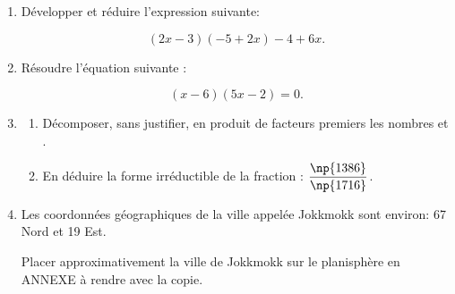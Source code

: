\documentclass[exercice,a4]{thedocument}%
\begin{document}
\begin{enumerate}
\item Développer et réduire l'expression suivante:

\[(2x - 3)(- 5 + 2x) - 4 + 6x.\]

\item Résoudre l'équation suivante :

\[(x - 6)(5x - 2) = 0.\]

\item
	\begin{enumerate}
		\item Décomposer, sans justifier, en produit de facteurs premiers les nombres  et .
		\item En déduire la forme irréductible de la fraction : $\dfrac{\np{1386}}{\np{1716}}$.
	\end{enumerate}
\item Les coordonnées géographiques de la ville appelée Jokkmokk sont environ: 67\degres{} Nord et 19\degres{} Est.

Placer approximativement la ville de Jokkmokk sur le planisphère en ANNEXE à rendre avec la copie.
\end{enumerate}

\bigskip

\medskip

\begin{center}
\end{center}

\vspace{1.5cm}

\showthesource
\end{document}
